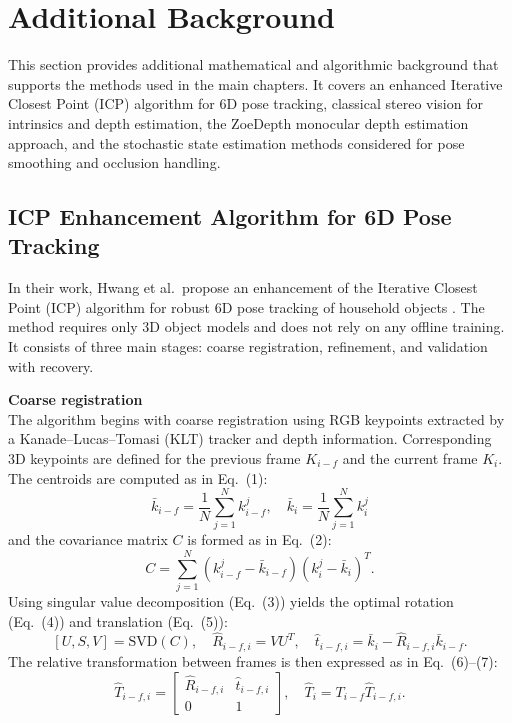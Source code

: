 \appendix

\section{Additional Background}
\label{sec:appendix-additional-background}

This section provides additional mathematical and algorithmic background that supports the methods used in the main chapters. It covers an enhanced Iterative Closest Point (ICP) algorithm for 6D pose tracking, classical stereo vision for intrinsics and depth estimation, the ZoeDepth monocular depth estimation approach, and the stochastic state estimation methods considered for pose smoothing and occlusion handling.

\subsection{ICP Enhancement Algorithm for 6D Pose Tracking}
\label{appendix:icp}

In their work, Hwang et al.\ propose an enhancement of the Iterative Closest Point (ICP) algorithm for robust 6D pose tracking of household objects \cite{hwang2025icp}. The method requires only 3D object models and does not rely on any offline training. It consists of three main stages: coarse registration, refinement, and validation with recovery.

\textbf{Coarse registration} \\
The algorithm begins with coarse registration using RGB keypoints extracted by a Kanade–Lucas–Tomasi (KLT) tracker and depth information. Corresponding 3D keypoints are defined for the previous frame $K_{i-f}$ and the current frame $K_i$. The centroids are computed as in Eq.~(1):
\[
\bar{k}_{i-f} = \frac{1}{N}\sum_{j=1}^N k^j_{i-f}, \quad 
\bar{k}_i = \frac{1}{N}\sum_{j=1}^N k^j_i
\]
and the covariance matrix $C$ is formed as in Eq.~(2):
\[
C = \sum_{j=1}^N (k^j_{i-f} - \bar{k}_{i-f})(k^j_i - \bar{k}_i)^T.
\]
Using singular value decomposition (Eq.~(3)) yields the optimal rotation (Eq.~(4)) and translation (Eq.~(5)):
\[
[U,S,V] = \mathrm{SVD}(C), \quad 
\hat{R}_{i-f,i} = VU^T, \quad
\hat{t}_{i-f,i} = \bar{k}_i - \hat{R}_{i-f,i}\bar{k}_{i-f}.
\]
The relative transformation between frames is then expressed as in Eq.~(6)–(7):
\[
\hat{T}_{i-f,i} =
\begin{bmatrix}
\hat{R}_{i-f,i} & \hat{t}_{i-f,i} \\ 0 & 1
\end{bmatrix}, 
\quad \hat{T}_i = T_{i-f}\hat{T}_{i-f,i}.
\]

